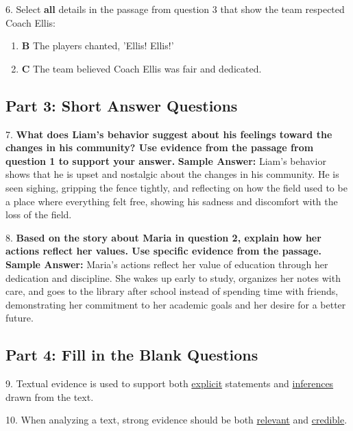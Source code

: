 \documentclass[12pt]{article}
\begin{document}
6. Select \textbf{all} details in the passage from question 3 that show the team respected Coach Ellis:
\begin{enumerate}[label=\Alph*.]
    \item \textbf{B} The players chanted, 'Ellis! Ellis!'
    \item \textbf{C} The team believed Coach Ellis was fair and dedicated.
\end{enumerate}

\subsection*{Part 3: Short Answer Questions}

7. \textbf{What does Liam’s behavior suggest about his feelings toward the changes in his community? Use evidence from the passage from question 1 to support your answer.}
\textbf{Sample Answer:} Liam's behavior shows that he is upset and nostalgic about the changes in his community. He is seen sighing, gripping the fence tightly, and reflecting on how the field used to be a place where everything felt free, showing his sadness and discomfort with the loss of the field.

8. \textbf{Based on the story about Maria in question 2, explain how her actions reflect her values. Use specific evidence from the passage.}
\textbf{Sample Answer:} Maria's actions reflect her value of education through her dedication and discipline. She wakes up early to study, organizes her notes with care, and goes to the library after school instead of spending time with friends, demonstrating her commitment to her academic goals and her desire for a better future.

\subsection*{Part 4: Fill in the Blank Questions}

9. Textual evidence is used to support both \underline{explicit} statements and \underline{inferences} drawn from the text.

10. When analyzing a text, strong evidence should be both \underline{relevant} and \underline{credible}.
\end{document}
